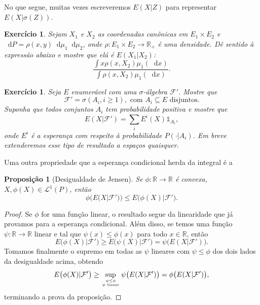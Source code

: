 \documentclass[reqno]{article}
\newcommand*\1{\mathds{1}}
\newtheorem{proposition}[theorem]{Proposição}
\newtheorem{exercise}[example]{Exercício}
\renewcommand*\d{\mathop{}\!\mathrm{d}}
\begin{document}
\newpage

No que segue, muitas vezes escreveremos $E(X|Z)$ para representar $E(X|\sigma(Z))$.

\begin{exercise}
  Sejam $X_1$ e $X_2$ as coordenadas canônicas em $E_1 \times E_2$ e $\d P = \rho(x,y) \d \mu_1 \d \mu_2$, onde $\rho:E_1 \times E_2 \to \mathbb{R}_+$ é uma densidade.
  Dê sentido à expressão abaixo e mostre que elá é $E(X_1|X_2)$:
  \begin{equation}
     \frac{\int x\rho(x, X_2) \mu_1(\d x)}{\int \rho(x, X_2) \mu_1(\d x)}.
  \end{equation}
\end{exercise}

\begin{exercise}
  Seja $E$ enumerável com uma $\sigma$-álgebra $\mathcal{F}'$.
  Mostre que
  \begin{equation}
    \mathcal{F}' = \sigma(A_i, i \geq 1), \text{ com $A_i \subseteq E$ disjuntos}.
  \end{equation}
  Suponha que todos conjuntos $A_i$ tem probabilidade positiva e mostre que
  \begin{equation}
    E(X|\mathcal{F}') = \sum_i E^i(X) \1_{A_i},
  \end{equation}
  onde $E^i$ é a esperança com respeito à probabilidade $P(\cdot|A_i)$.
  Em breve extenderemos esse tipo de resultado a espaços quaisquer.
\end{exercise}

\newpage

Uma outra propriedade que a esperança condicional herda da integral é a

\begin{proposition}[Desigualdade de Jensen]
  Se $\phi:\mathbb{R} \to \mathbb{R}$ é convexa, $X, \phi(X) \in \mathcal{L}^1(P)$, então
  \begin{equation}
    \phi\big( E(X|\mathcal{F}') \big) \leq E\big( \phi(X) | \mathcal{F}' \big).
  \end{equation}
\end{proposition}

\begin{proof}
  Se $\phi$ for uma função linear, o resultado segue da linearidade que já provamos para a esperança condicional.
  Além disso, se temos uma função $\psi:\mathbb{R} \to \mathbb{R}$ linear e tal que $\psi(x) \leq \phi(x)$ para todo $x \in \mathbb{R}$, então
  \begin{equation}
    E\big( \phi(X) | \mathcal{F}' \big) \geq E\big( \psi(X) | \mathcal{F}' \big) = \psi \big( E(X|\mathcal{F}') \big).
  \end{equation}
  Tomamos finalmente o supremo em todas as $\psi$ lineares com $\psi \leq \phi$ dos dois lados da desigualdade acima, obtendo
  \begin{equation}
    E\big( \phi(X) | \mathcal{F}' \big) \geq \sup_{\psi \leq \phi \atop \psi \text{ linear}} \psi \big( E(X|\mathcal{F}') \big) = \phi \big( E(X|\mathcal{F}') \big),
  \end{equation}
  terminando a prova da proposição.
\end{proof}
\end{document}
